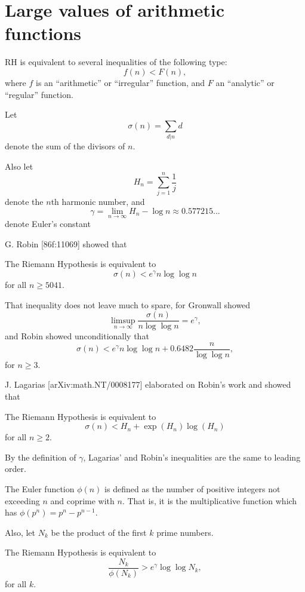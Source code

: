 \documentclass[12pt,letterpaper, reqno]{amsart}
\begin{document}
\section{Large values of arithmetic functions}

RH is equivalent to several inequalities of the following type:
$$
f(n) < F(n),
$$
where $f$ is an ``arithmetic'' or ``irregular'' function,
and $F$ an ``analytic'' or ``regular'' function.

\begin{problemblock}
Let
$$
\sigma(n) = \sum_{d|n} d
$$
denote the sum of the divisors of $n$.

Also let
$$
 H_n = \sum_{j=1}^n \frac{1}{j}
$$
denote the $n$th harmonic number, and
$$
\gamma =\lim_{n\to\infty} H_n - \log n \approx  0.577215...
$$
denote Euler's constant

G. Robin [86f:11069] showed that
\begin{rhequivalence}[3.1]The Riemann Hypothesis is
equivalent to
$$
\sigma(n) < e^\gamma n \log\log n
$$
for all $n\ge 5041$.
\end{rhequivalence}
\begin{distinguishedremark}
That inequality does not leave much to spare, for Gronwall showed
$$
\limsup_{n\to\infty} \frac{\sigma(n)}{n \log\log n} = e^\gamma ,
$$
and Robin showed unconditionally that
$$
\sigma(n) < e^\gamma n \log\log n + 0.6482 \frac{n}{\log\log n},
$$
for $n\ge 3$.
\end{distinguishedremark}
\end{problemblock}

\begin{problemblock}
J. Lagarias [arXiv:math.NT/0008177] elaborated on Robin's
work and showed that
\begin{rhequivalence}[3.15]
The Riemann Hypothesis is equivalent to
$$
\sigma(n) < H_n + \exp(H_n)\log(H_n)
$$
for all $n\ge 2$.
\end{rhequivalence}

\begin{remark}
By the definition of $\gamma$,
Lagarias' and Robin's inequalities are the same to leading order.
\end{remark}

\end{problemblock}

\begin{problemblock}
The Euler function $\phi (n)$ is defined as the number of positive integers not exceeding $n$ and coprime with $n$.
That is, it is the multiplicative function which has
$\phi(p^n)=p^n-p^{n-1}$.

Also, let $N_k$ be the product of the first $k$ prime numbers.
\begin{rhequivalence}[3.2]The Riemann Hypothesis is
equivalent to
$$
\frac{N_k}{\phi(N_k)} > e^{\gamma} \log \log N_k,
$$
for all $k$.
\end{rhequivalence}
\end{problemblock}
\end{document}
